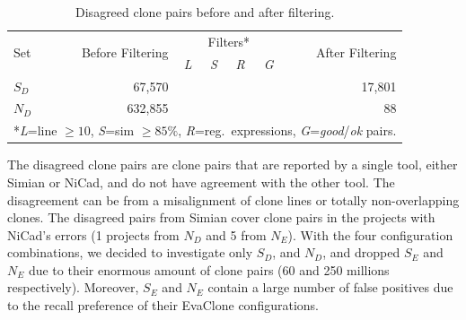 \documentclass[sigconf,review, anonymous]{acmart}
\begin{document}
\begin{table}
	\centering
	\caption{Disagreed clone pairs before and after filtering.}
	\label{tab:online_clone_pairs}
	\small
	\begin{tabular}{l|r|c|c|c|c|r}
		\hline
		\multirow{2}{*}{Set} & \multirow{2}{*}{Before Filtering} & \multicolumn{4}{c|}{Filters*} & \multirow{2}{*}{After Filtering} \\ \cline{3-6}
		& & \textit{L} & \textit{S} & \textit{R} & \textit{G} & \\
		\hline 
		\multirow{1}{*}{$S_D$} & 67,570 & \checkmark & & \checkmark & \checkmark & 17,801 \\
		\multirow{1}{*}{$N_D$} & 632,855 & & \checkmark & \checkmark & \checkmark & 88 \\ 
		\hline
		\multicolumn{7}{l}{*\textit{L}=line $\geq 10$, \textit{S}=sim $\geq 85\%$, \textit{R}=reg.~expressions, \textit{G}=\textit{good}/\textit{ok} pairs.}  \\
	\end{tabular} %
\end{table}

The disagreed clone pairs are clone pairs that are reported by a single tool, either Simian or NiCad, and do not have agreement with the other tool. The disagreement can be from a misalignment of clone lines or totally non-overlapping clones. The disagreed pairs from Simian cover clone pairs in the projects with NiCad's errors (1 projects from $N_D$ and 5 from $N_E$). %
With the four configuration combinations, we decided to investigate only $S_D$, and $N_D$, and dropped $S_E$ and $N_E$ due to their enormous amount of clone pairs (60 and 250 millions respectively). Moreover, $S_E$ and $N_E$ contain a large number of false positives due to the recall preference of their EvaClone configurations. 
\end{document}
